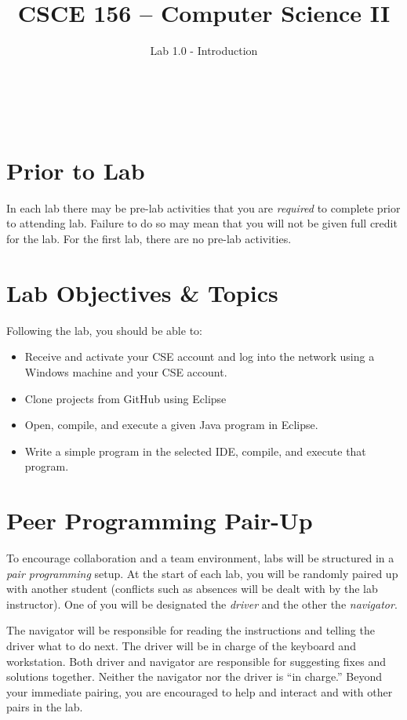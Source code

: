 \documentclass[12pt]{scrartcl}
\title{CSCE 156 -- Computer Science II}
\subtitle{Lab 1.0 - Introduction}
\author{~}
\date{~}
\begin{document}
\maketitle

\section*{Prior to Lab}

In each lab there may be pre-lab activities that you are \emph{required} to
complete prior to attending lab.  Failure to do so may mean that you will
not be given full credit for the lab.  For the first lab, there are no pre-lab
activities.

\section{Lab Objectives \& Topics}
Following the lab, you should be able to:
\begin{itemize}
  \item Receive and activate your CSE account and log into the network 
  	using a Windows machine and your CSE account.
  \item Clone projects from GitHub using Eclipse
  \item Open, compile, and execute a given Java program in Eclipse.
  \item Write a simple program in the selected IDE, compile, and 
  	execute that program.
\end{itemize}

\section*{Peer Programming Pair-Up}

To encourage collaboration and a team environment, labs will be
structured in a \emph{pair programming} setup.  At the start of
each lab, you will be randomly paired up with another student 
(conflicts such as absences will be dealt with by the lab instructor).
One of you will be designated the \emph{driver} and the other
the \emph{navigator}.  

The navigator will be responsible for reading the instructions and
telling the driver what to do next.  The driver will be in charge of the
keyboard and workstation.  Both driver and navigator are responsible
for suggesting fixes and solutions together.  Neither the navigator
nor the driver is ``in charge.''  Beyond your immediate pairing, you
are encouraged to help and interact and with other pairs in the lab.
\end{document}
